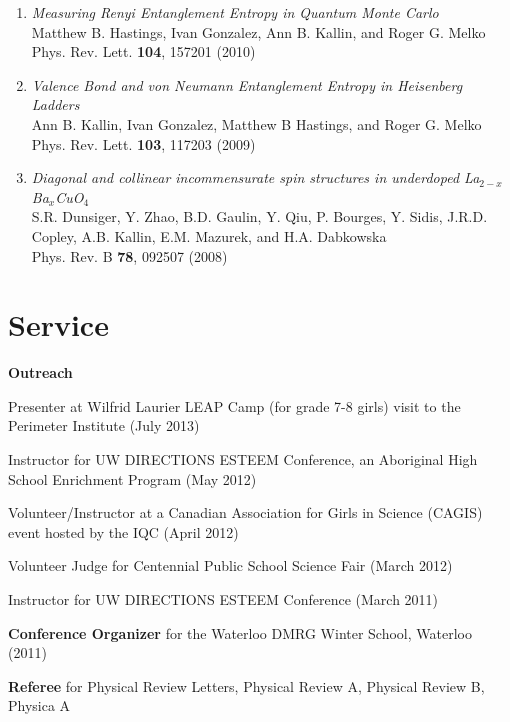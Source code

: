 \documentclass[letterpaper]{article}
\renewenvironment{itemize}{
  \begin{list}{}{
    \setlength{\leftmargin}{1.5em}
  }
}{
  \end{list}
}
\begin{document}
\begin{enumerate}
\item  {\it Measuring Renyi Entanglement Entropy in Quantum Monte Carlo}\\%
Matthew B. Hastings, Ivan Gonzalez, Ann B. Kallin, and Roger G. Melko \\
Phys. Rev. Lett. {\bf 104}, 157201 (2010) 

\item  {\it Valence Bond and von Neumann Entanglement Entropy in Heisenberg Ladders} \\%
Ann B. Kallin, Ivan Gonzalez, Matthew B Hastings, and Roger G. Melko\\
Phys. Rev. Lett. {\bf 103}, 117203 (2009)

\item {\it Diagonal and collinear incommensurate spin structures in underdoped La$_{2-x}$Ba$_x$CuO$_4$} \\%
    S.R. Dunsiger, Y. Zhao, B.D. Gaulin, Y. Qiu, P. Bourges, Y. Sidis, J.R.D. Copley,  
  A.B. Kallin, E.M. Mazurek, and H.A. Dabkowska \\
Phys. Rev. B {\bf 78}, 092507 (2008) 
\end{enumerate}

\section*{Service}

\begin{itemize}

\item {\bf Outreach} 
	\begin{itemize}
	
	\item Presenter at Wilfrid Laurier LEAP Camp (for grade 7-8 girls) visit to the Perimeter Institute (July 2013)
	\item Instructor for UW DIRECTIONS ESTEEM Conference, an Aboriginal High School Enrichment Program (May 2012)
	\item Volunteer/Instructor at a Canadian Association for Girls in Science (CAGIS) event hosted by the IQC (April 2012)
	\item Volunteer Judge for Centennial Public School Science Fair (March 2012)
	\item Instructor for UW DIRECTIONS ESTEEM Conference (March 2011)
	\end{itemize}

\item {\bf Conference Organizer} for the Waterloo DMRG Winter School, Waterloo (2011)	
\item {\bf Referee} for Physical Review Letters, Physical Review A, Physical Review B, Physica A
\end{itemize}
\end{document}
